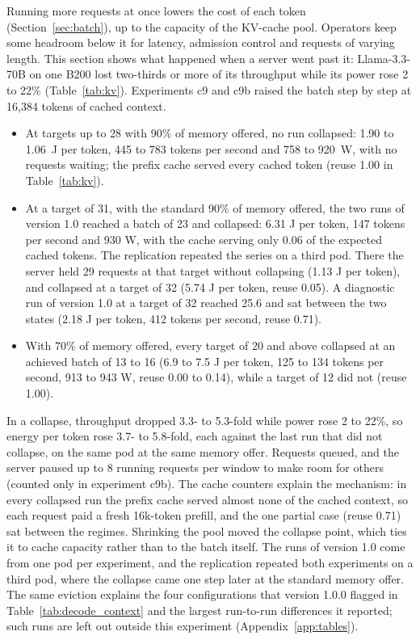 \documentclass[11pt]{article}
\begin{document}
Running more requests at once lowers the cost of each token (Section~\ref{sec:batch}), up to the capacity of the KV-cache pool. Operators keep some headroom below it for latency, admission control and requests of varying length. This section shows what happened when a server went past it: Llama-3.3-70B on one B200 lost two-thirds or more of its throughput while its power rose 2 to 22\% (Table~\ref{tab:kv}). Experiments c9 and c9b raised the batch step by step at 16,384 tokens of cached context.
\begin{itemize}
\item At targets up to 28 with 90\% of memory offered, no run collapsed: 1.90 to 1.06~J per token, 445 to 783 tokens per second and 758 to 920~W, with no requests waiting; the prefix cache served every cached token (reuse 1.00 in Table~\ref{tab:kv}).
\item At a target of 31, with the standard 90\% of memory offered, the two runs of version 1.0 reached a batch of 23 and collapsed: 6.31 J per token, 147 tokens per second and 930 W, with the cache serving only 0.06 of the expected cached tokens. The replication repeated the series on a third pod. There the server held 29 requests at that target without collapsing (1.13 J per token), and collapsed at a target of 32 (5.74 J per token, reuse 0.05). A diagnostic run of version 1.0 at a target of 32 reached 25.6 and sat between the two states (2.18 J per token, 412 tokens per second, reuse 0.71).
\item With 70\% of memory offered, every target of 20 and above collapsed at an achieved batch of 13 to 16 (6.9 to 7.5 J per token, 125 to 134 tokens per second, 913 to 943 W, reuse 0.00 to 0.14), while a target of 12 did not (reuse 1.00).
\end{itemize}
In a collapse, throughput dropped 3.3- to 5.3-fold while power rose 2 to 22\%, so energy per token rose 3.7- to 5.8-fold, each against the last run that did not collapse, on the same pod at the same memory offer. Requests queued, and the server paused up to 8 running requests per window to make room for others (counted only in experiment c9b). The cache counters explain the mechanism: in every collapsed run the prefix cache served almost none of the cached context, so each request paid a fresh 16k-token prefill, and the one partial case (reuse 0.71) sat between the regimes. Shrinking the pool moved the collapse point, which ties it to cache capacity rather than to the batch itself. The runs of version 1.0 come from one pod per experiment, and the replication repeated both experiments on a third pod, where the collapse came one step later at the standard memory offer. The same eviction explains the four configurations that version 1.0.0 flagged in Table~\ref{tab:decode_context} and the largest run-to-run differences it reported; such runs are left out outside this experiment (Appendix~\ref{app:tables}).
\end{document}
